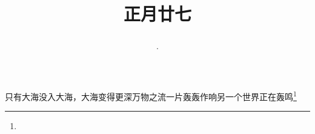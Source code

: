 \title{\date[d=7,m=3,y=2024][year:cn-y,年,month:cn,day:cn,日,·,weekday]·正月廿七 }
只有大海没入大海，大海变得更深万物之流一片轰轰作响另一个世界正在轰鸣\footnote{ }

